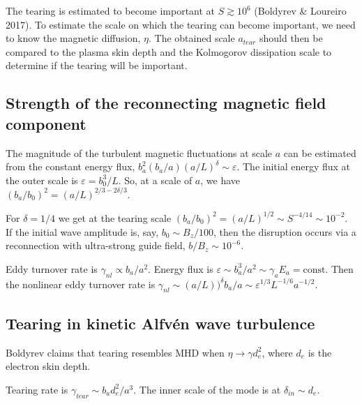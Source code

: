 \documentclass[usenatbib,twocolumn, twocolappendix]{aastex63}
\begin{document}
\begin{appendix}
The tearing is estimated to become important at $S \gtrsim 10^6$ (Boldyrev \& Loureiro 2017).
To estimate the scale on which the tearing can become important, we need to know the magnetic diffusion, $\eta$.
The obtained scale $a_{tear}$ should then be compared to the plasma skin depth and the Kolmogorov dissipation scale to determine if the tearing will be important.

\subsection{Strength of the reconnecting magnetic field component}

The magnitude of the turbulent magnetic fluctuations at scale $a$ can be estimated from the constant energy flux, $b_a^2 (b_a/a)(a/L)^{\delta} \sim \varepsilon$.
The initial energy flux at the outer scale is $\varepsilon = b_0^3 /L$.
So, at a scale of $a$, we have 
$(b_a/b_0)^2 = (a/L)^{2/3 -2\delta/3}$.

For $\delta = 1/4$ we get at the tearing scale $(b_a/b_0)^2 = (a/L)^{1/2} \sim S^{-4/14} \sim 10^{-2}$.
If the initial wave amplitude is, say, $b_0 \sim B_z/100$, then the disruption occurs via a reconnection with ultra-strong guide field, $b/B_z \sim 10^{-6}$.



Eddy turnover rate is $\gamma_{nl} \propto b_a/a^2$.
Energy flux is $\varepsilon \sim b_a^3/a^2 \sim \gamma_a E_a = \mathrm{const}$.
Then the nonlinear eddy turnover rate is $\gamma_{nl} \sim (a/L))^\delta b_a/a \sim \varepsilon^{1/3} L^{-1/6} a^{-1/2}$.


\subsection{Tearing in kinetic Alfv\'en wave turbulence}

Boldyrev claims that tearing resembles MHD when $\eta \rightarrow \gamma d_e^2$, where $d_e$ is the electron skin depth.

Tearing rate is $\gamma_{tear} \sim b_a d_e^2/a^3$.
The inner scale of the mode is at $\delta_{in} \sim d_e$.



\end{appendix}
\end{document}
